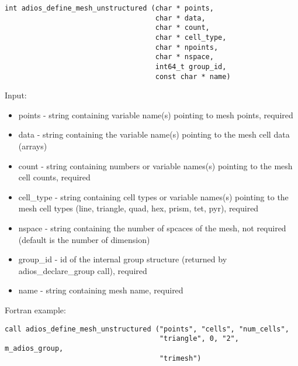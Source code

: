 \begin{lstlisting}[alsolanguage=Fortran,caption={},label={}]
int adios_define_mesh_unstructured (char * points,
                                    char * data,
                                    char * count,
                                    char * cell_type,
                                    char * npoints,
                                    char * nspace,
                                    int64_t group_id,
                                    const char * name)
\end{lstlisting}

Input:
\begin{itemize}
\item points - string containing variable name(s) pointing to mesh points, required
\item data - string containing the variable name(s) pointing to the mesh cell data (arrays)
\item count - string containing numbers or variable names(s) pointing to the mesh cell counts, required
\item cell\_type - string containing cell types or variable names(s) pointing to the mesh cell types 
(line, triangle, quad, hex, prism, tet, pyr), required
\item nspace - string containing the number of spcaces of the mesh, not required (default is the number of dimension)
\item group\_id - id of the internal group structure (returned by adios\_declare\_group call), required
\item name - string containing mesh name, required
\end{itemize}

Fortran example:
\begin{lstlisting}[alsolanguage=Fortran,caption={},label={}]
call adios_define_mesh_unstructured ("points", "cells", "num_cells", 
                                     "triangle", 0, "2", m_adios_group, 
                                     "trimesh")
\end{lstlisting}
